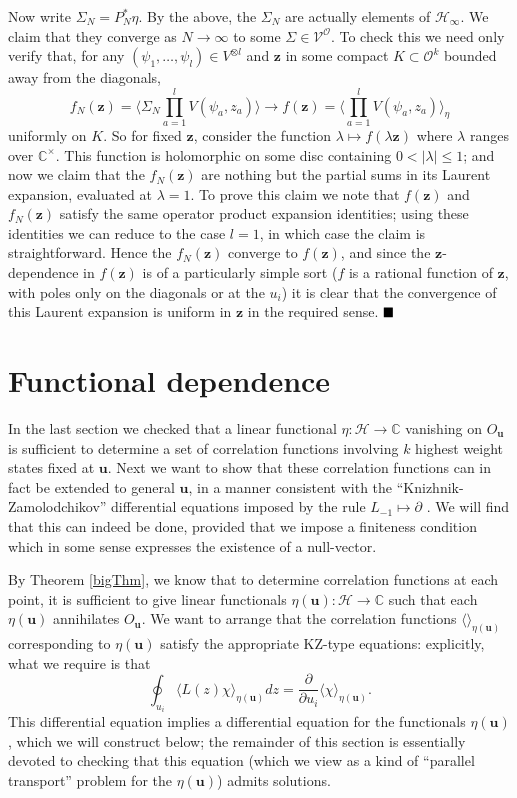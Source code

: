 \documentclass[a4paper,12pt]{article}
\newcommand{\C}{{\mathbb C}}
\newcommand{\uu}{{\mathbf u}}
\newcommand{\zz}{{\mathbf z}}
\newcommand{\F}{{\mathcal H}}
\newcommand{\OO}{{\mathcal O}}
\newcommand{\V}{{\mathcal V}}
\newcommand{\abs}[1]{\lvert#1\rvert}
\newcommand{\IP}[1]{\langle#1\rangle}
\newcommand{\done}{$\hfill \hfill \blacksquare$ \bigskip}
\newcommand{\dwrt}[1]{\frac{\partial}{\partial#1}}
\begin{document}
Now write $\Sigma_N = P_N^* \eta$.  By the above, the $\Sigma_N$ are actually elements of $\F_\infty$.  
We claim that they converge as $N \to \infty$ to some $\Sigma \in \V^\OO$.  To check this 
we need only verify that, for any $(\psi_1, \dots, \psi_l) \in V^{\otimes l}$ and $\zz$ in some compact $K \subset \OO^k$ bounded away from the diagonals,
\begin{equation}
f_N(\zz) = \IP{\Sigma_N \prod_{a=1}^l V(\psi_a, z_a)} \to f(\zz) = \IP{\prod_{a=1}^l V(\psi_a, z_a)}_\eta
\end{equation}
uniformly on $K$.
So for fixed $\zz$, consider the function $\lambda \mapsto f(\lambda \zz)$ 
where $\lambda$ ranges over $\C^\times$.
This function is holomorphic on some disc containing $0 < \abs{\lambda} \le 1$; and now we claim that 
the $f_N(\zz)$ are nothing but the partial sums in its Laurent expansion, evaluated at $\lambda=1$.
To prove this claim we note that $f(\zz)$ and $f_N(\zz)$ satisfy the same operator product expansion identities;
using these identities we can reduce to the case $l=1$, in which case the claim is straightforward.
Hence the $f_N(\zz)$ converge to $f(\zz)$, and since the $\zz$-dependence in $f(\zz)$ is of a particularly simple sort
($f$ is a rational function of $\zz$, with poles only on the diagonals or at the $u_i$) it is clear that the
convergence of this Laurent expansion is uniform in $\zz$ in the required sense. \done


\section{Functional dependence} \label{funcdep}

In the last section we 
checked that a linear functional $\eta: \F \to \C$ vanishing on $O_\uu$ is sufficient to determine a set of
correlation functions involving $k$ highest weight states fixed at $\uu$.  Next we want to show that these correlation
functions can in fact be extended to general $\uu$, in a manner consistent with the ``Knizhnik-Zamolodchikov'' differential
equations imposed by the rule $L_{-1} \mapsto \partial$ \cite{KZ}.  We will find that this can indeed be done, provided
that we impose a finiteness condition which in some sense expresses the existence of a null-vector.

By Theorem \ref{bigThm}, we know that to determine correlation functions at each point, 
it is sufficient to give linear functionals $\eta(\uu): \F \to \C$ such that each $\eta(\uu)$ annihilates
$O_\uu$.  We want to arrange that the correlation functions $\IP{}_{\eta(\uu)}$ corresponding to $\eta(\uu)$ satisfy the
appropriate KZ-type equations:  explicitly, what we require is that
\begin{equation}
\oint_{u_i} \IP{L(z) \chi}_{\eta(\uu)} dz = \dwrt{u_i} \IP{\chi}_{\eta(\uu)}.
\end{equation}
This differential equation implies a differential equation for the functionals $\eta(\uu)$, which
we will construct below; the remainder of this section is essentially devoted to checking that this
equation (which we view as a kind of ``parallel transport'' problem for the $\eta(\uu)$) admits solutions.
\end{document}
